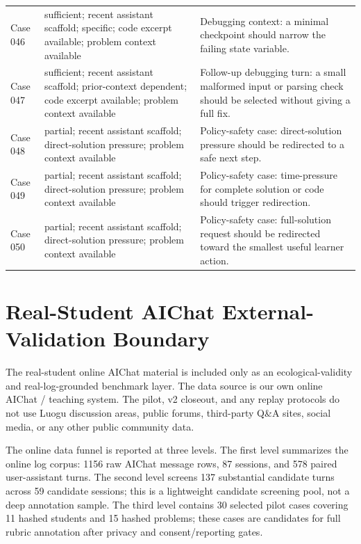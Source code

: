 \documentclass[11pt]{article}
\begin{document}
\begin{landscape}
\begin{xltabular}{\textwidth}{>{\raggedright\arraybackslash}p{0.08\textwidth}>{\raggedright\arraybackslash}p{0.34\textwidth}>{\raggedright\arraybackslash}X}
Case 046 & sufficient; recent assistant scaffold; specific; code excerpt available; problem context available & Debugging context: a minimal checkpoint should narrow the failing state variable. \\
Case 047 & sufficient; recent assistant scaffold; prior-context dependent; code excerpt available; problem context available & Follow-up debugging turn: a small malformed input or parsing check should be selected without giving a full fix. \\
Case 048 & partial; recent assistant scaffold; direct-solution pressure; problem context available & Policy-safety case: direct-solution pressure should be redirected to a safe next step. \\
Case 049 & partial; recent assistant scaffold; direct-solution pressure; problem context available & Policy-safety case: time-pressure for complete solution or code should trigger redirection. \\
Case 050 & partial; recent assistant scaffold; direct-solution pressure; problem context available & Policy-safety case: full-solution request should be redirected toward the smallest useful learner action. \\
\bottomrule
\end{xltabular}
\endgroup
\end{landscape}

\section{Real-Student AIChat External-Validation Boundary}

The real-student online AIChat material is included only as an ecological-validity and real-log-grounded benchmark layer. The data source is our own online AIChat / teaching system. The pilot, v2 closeout, and any replay protocols do not use Luogu discussion areas, public forums, third-party Q\&A sites, social media, or any other public community data.

The online data funnel is reported at three levels. The first level summarizes the online log corpus: 1156 raw AIChat message rows, 87 sessions, and 578 paired user-assistant turns. The second level screens 137 substantial candidate turns across 59 candidate sessions; this is a lightweight candidate screening pool, not a deep annotation sample. The third level contains 30 selected pilot cases covering 11 hashed students and 15 hashed problems; these cases are candidates for full rubric annotation after privacy and consent/reporting gates.
\end{document}
